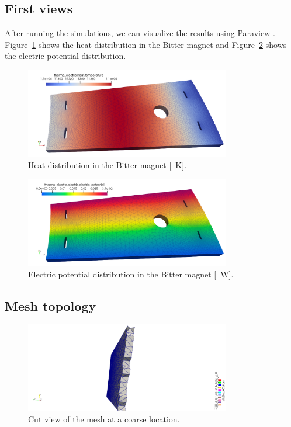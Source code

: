 \documentclass[12pt]{article}
\begin{document}
\subsection{First views}
After running the simulations, we can visualize the results using Paraview \cite{paraview}.
Figure~\ref{fig:heat_distribution} shows the heat distribution in the Bitter magnet
and Figure~\ref{fig:electric_potential} shows the electric potential distribution.
\begin{figure}[H]
  \centering
  \includegraphics[width=0.8\textwidth]{images/heat.png}
  \caption{Heat distribution in the Bitter magnet [\SI{}{\kelvin}].}
  \label{fig:heat_distribution}
\end{figure}
\begin{figure}[H]
  \centering
  \includegraphics[width=0.8\textwidth]{images/electric_potential.png}
  \caption{Electric potential distribution in the Bitter magnet [\SI{}{\watt}].}
  \label{fig:electric_potential}
\end{figure}

\subsection{Mesh topology}
\begin{figure}[H]
  \centering
  \includegraphics[width=0.8\textwidth]{images/grossier2.png}
  \caption{Cut view of the mesh at a coarse location.}
\end{figure}
\end{document}
